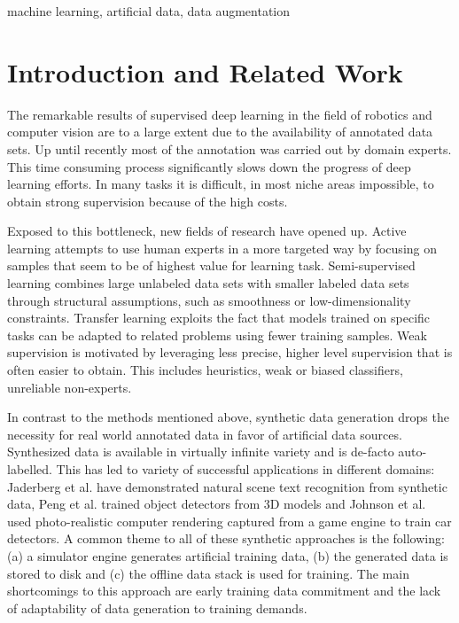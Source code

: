 \documentclass[conference]{IEEEtran}
\begin{document}
\begin{IEEEkeywords}
machine learning, artificial data, data augmentation
\end{IEEEkeywords}

\section{Introduction and Related Work}
The remarkable results of supervised deep learning in the field of robotics and computer vision are to a large extent due to the availability of annotated data sets. Up until recently most of the annotation was carried out by domain experts. This time consuming process significantly slows down the progress of deep learning efforts. In many tasks it is difficult, in most niche areas impossible, to obtain strong supervision because of the high costs.

Exposed to this bottleneck, new fields of research have opened up. Active learning \cite{druck2009active, settles2012active, cakmak2012designing} attempts to use human experts in a more targeted way by focusing on samples that seem to be of highest value for learning task. Semi-supervised learning \cite{chapelle2009semi, salimans2016improved, zhu2006semi} combines large unlabeled data sets with smaller labeled data sets through structural assumptions, such as smoothness or low-dimensionality constraints. Transfer learning \cite{pratt1993discriminability, ventura2007theoretical, pan2010survey} exploits the fact that models trained on specific tasks can be adapted to related problems using fewer training samples. Weak supervision \cite{ratner2016data, zhou2017brief} is motivated by leveraging less precise, higher level supervision that is often easier to obtain. This includes heuristics, weak or biased classifiers, unreliable non-experts. 


In contrast to the methods mentioned above, synthetic data generation drops the necessity for real world annotated data in favor of artificial data sources. Synthesized data is available in virtually infinite variety and is de-facto auto-labelled. This has led to variety of successful applications in different domains: Jaderberg et al. \cite{jaderberg2014synthetic} have demonstrated natural scene text recognition from synthetic data, Peng et al. \cite{peng2015learning} trained object detectors from 3D models and Johnson et al. \cite{2017_Johnson_DrivingInTheMatrix} used photo-realistic computer rendering captured from a game engine to train car detectors. A common theme to all of these synthetic approaches is the following: (a) a simulator engine generates artificial training data, (b) the generated data is stored to disk and (c) the offline data stack is used for training. The main shortcomings to this approach are early training data commitment and the lack of adaptability of data generation to training demands.
\end{document}
